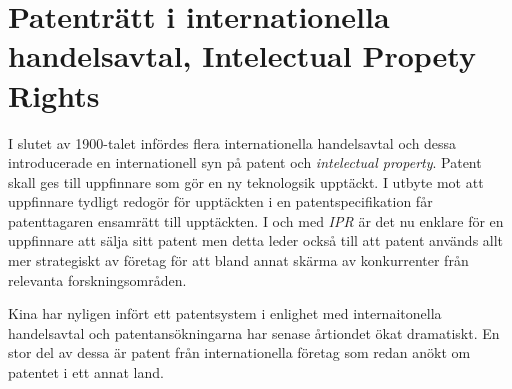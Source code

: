 \section{Patenträtt i internationella handelsavtal, Intelectual Propety Rights}

I slutet av 1900-talet infördes flera internationella handelsavtal och dessa introducerade en
internationell syn på patent och \emph{intelectual property}. Patent skall ges till uppfinnare som gör en
ny teknologsik upptäckt. I utbyte mot att uppfinnare tydligt redogör för upptäckten i en
patentspecifikation får patenttagaren ensamrätt till upptäckten. I och med \emph{IPR} är det nu enklare för en uppfinnare att sälja sitt patent men detta leder också till att patent används allt mer strategiskt av företag för att bland annat skärma av konkurrenter från relevanta forskningsområden.

Kina har nyligen infört ett patentsystem i enlighet med internaitonella handelsavtal och patentansökningarna har senase årtiondet ökat dramatiskt. En stor del av dessa är patent från internationella företag som redan anökt om patentet i ett annat land.

%
%
%
